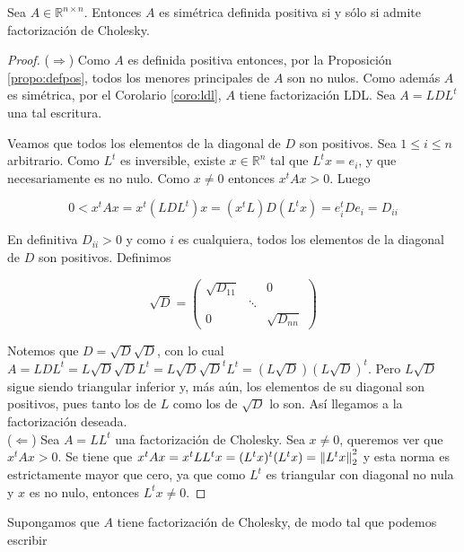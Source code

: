 \begin{propo}
Sea $A \in \mathbb{R}^{n \times n}$. Entonces $A$ es simétrica definida positiva si y sólo si admite factorización de Cholesky.

\begin{proof}
($\Rightarrow$) Como $A$ es definida positiva entonces, por la Proposición \ref{propo:defpos}, todos los menores principales de $A$ son no nulos. Como además $A$ es simétrica, por el Corolario \ref{coro:ldl}, $A$ tiene factorización LDL. Sea $A = LDL^t$ una tal escritura.

Veamos que todos los elementos de la diagonal de $D$ son positivos. Sea $1 \leq i \leq n$ arbitrario. Como $L^t$ es inversible, existe $x \in \mathbb{R}^n$ tal que $L^tx = e_i$, y que necesariamente es no nulo. Como $x \neq 0$ entonces $x^t A x > 0$. Luego

\[0 < x^t A x = x^t (LDL^t) x = (x^tL) D (L^tx) = e_i^t D e_i = D_{ii}\]

En definitiva $D_{ii} > 0$ y como $i$ es cualquiera, todos los elementos de la diagonal de $D$ son positivos. Definimos

\[\sqrt{D} = \begin{pmatrix}
\sqrt{D_{11}} & & 0\\
 & \ddots & \\
0 & & \sqrt{D_{nn}}
\end{pmatrix}\]

Notemos que $D = \sqrt{D} \sqrt{D}$, con lo cual $A = LDL^t = L\sqrt{D}\sqrt{D}L^t = L\sqrt{D}\sqrt{D}^tL^t = (L \sqrt{D}) (L \sqrt{D})^t$. Pero $L \sqrt{D}$ sigue siendo triangular inferior y, más aún, los elementos de su diagonal son positivos, pues tanto los de $L$ como los de $\sqrt{D}$ lo son. Así llegamos a la factorización deseada.\\[0.25cm]

($\Leftarrow$) Sea $A = LL^t$ una factorización de Cholesky. Sea $x \neq 0$, queremos ver que $x^t A x > 0$. Se tiene que $x^t A x = x^t LL^t x = (L^tx)^t(L^tx) = \left\lVert L^tx\right\rVert_2^2$ y esta norma es estrictamente mayor que cero, ya que como $L^t$ es triangular con diagonal no nula y $x$ es no nulo, entonces $L^tx \neq 0$.

\end{proof}
\end{propo}

Supongamos que $A$ tiene factorización de Cholesky, de modo tal que podemos escribir

